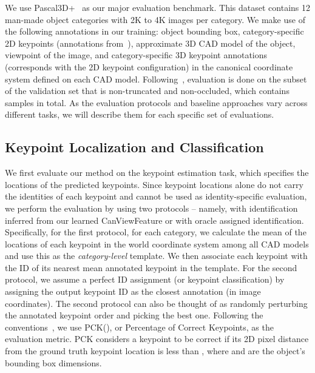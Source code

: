 \documentclass[runningheads]{llncs}
\begin{document}
We use Pascal3D+~\cite{xiang2014beyond} as our major evaluation benchmark.  This dataset contains 12 man-made object categories with 2K to 4K images per category. We make use of the following annotations in our training:
object bounding box, category-specific 2D keypoints (annotations from~\cite{bourdev2010detecting}), approximate 3D CAD model of the object, viewpoint of the image, and category-specific 3D keypoint annotations (corresponds with the 2D keypoint configuration) in the canonical coordinate system defined on each CAD model.
Following~\cite{tulsiani2015viewpoints,su2015render}, evaluation is done on the subset of the validation set that is non-truncated and non-occluded, which contains  samples in total. 
As the evaluation protocols and baseline approaches vary across different tasks, we will describe them for each specific set of evaluations.

\subsection{Keypoint Localization and Classification}
\label{Subsection:Keypoint:Detection:Classification}

We first evaluate our method on the keypoint estimation task, which specifies the locations of the predicted keypoints. 
Since keypoint locations alone do not carry the identities of each keypoint and cannot be used as identity-specific evaluation, we perform the evaluation by using two protocols --
namely, with identification inferred from our learned CanViewFeature or with oracle assigned identification.
Specifically, for the first protocol, for each category, we calculate the mean of the locations of each keypoint in the world coordinate system among all CAD models and use this as the \emph{category-level} template. 
We then associate each keypoint with the ID of its nearest mean annotated keypoint in the template.
For the second protocol, we assume a perfect ID assignment (or keypoint classification) by assigning the output keypoint ID as the closest annotation (in image coordinates).
The second protocol can also be thought of as randomly perturbing the annotated keypoint order and picking the best one. 
Following the conventions~\cite{long2014convnets,tulsiani2015viewpoints}, we use PCK(), or Percentage of Correct Keypoints, as the evaluation metric. PCK considers a keypoint to be correct if its  2D pixel distance from the ground truth keypoint location is less than , where  and  are the object's bounding box dimensions.
\end{document}
